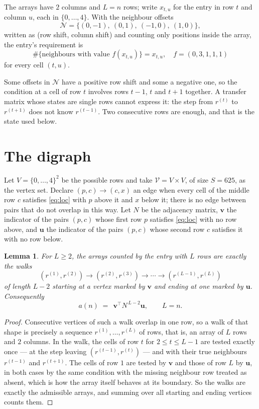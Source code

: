 \documentclass[11pt,a4paper]{article}
\theoremstyle{plain}
\newtheorem{lemma}[theorem]{Lemma}
\theoremstyle{definition}
\begin{document}
The arrays have $2$ columns and $L=n$ rows; write $x_{t,u}$ for the entry in
row $t$ and column $u$, each in $\{0,\dots,4\}$. With the neighbour offsets
\[
\mathcal N=\{(0,-1),\ (0,1),\ (-1,0),\ (1,0)\},
\]
written as (row shift, column shift) and counting only positions inside the array, the
entry's requirement is
\begin{equation}\label{eq:loc}
\#\{\text{neighbours with value }f(x_{t,u})\}=x_{t,u},\quad f=(0,3,1,1,1)
\end{equation}
for every cell $(t,u)$.

Some offsets in $\mathcal N$ have a positive row shift and some a negative one, so the
condition at a cell of row $t$ involves rows $t-1$, $t$ and $t+1$ together. A transfer
matrix whose states are single rows cannot express it: the step from $r^{(t)}$ to
$r^{(t+1)}$ does not know $r^{(t-1)}$. Two consecutive rows are enough, and that is
the state used below.

\section{The digraph}

Let $V=\{0,\dots,4\}^{2}$ be the possible rows and take
$\mathcal V=V\times V$, of size $S=625$, as the vertex set. Declare $(p,c)\to(c,x)$ an edge
when every cell of the middle row $c$ satisfies \eqref{eq:loc} with $p$ above it and $x$
below it; there is no edge between pairs that do not overlap in this way. Let $N$ be the
adjacency matrix, $\mathbf{v}$ the indicator of the pairs $(p,c)$ whose first row $p$
satisfies \eqref{eq:loc} with no row above, and $\mathbf{u}$ the indicator of
the pairs $(p,c)$ whose second row $c$ satisfies it with no row below.

\begin{lemma}\label{lem:walk}
For $L\ge2$, the arrays counted by the entry with $L$ rows are exactly the walks
\[
(r^{(1)},r^{(2)})\to(r^{(2)},r^{(3)})\to\cdots\to(r^{(L-1)},r^{(L)})
\]
of length $L-2$ starting at a vertex marked by $\mathbf{v}$ and ending at one marked by
$\mathbf{u}$. Consequently
\[
a(n)\;=\;\,\mathbf{v}^{\!\top}N^{\,L-2}\mathbf{u},\qquad L=n .
\]
\end{lemma}

\begin{proof}
Consecutive vertices of such a walk overlap in one row, so a walk of that shape is
precisely a sequence $r^{(1)},\dots,r^{(L)}$ of rows, that is, an array of $L$ rows
and $2$ columns. In the walk, the cells of row $t$ for $2\le t\le L-1$ are tested
exactly once --- at the step leaving $(r^{(t-1)},r^{(t)})$ --- and with their true
neighbours $r^{(t-1)}$ and $r^{(t+1)}$. The cells of row $1$ are tested by
$\mathbf{v}$ and those of row $L$ by $\mathbf{u}$, in both cases by the same condition
with the missing neighbour row treated as absent, which is how the array itself behaves at
its boundary. So the walks are exactly the admissible arrays, and summing over all starting
and ending vertices counts them.
\end{proof}
\end{document}
